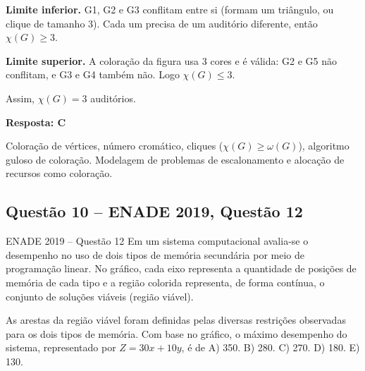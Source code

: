 \documentclass[11pt,a4paper]{article}
\newcommand{\resposta}[1]{\begin{gabarito}\textbf{Resposta: #1}\end{gabarito}}
\begin{document}
\textbf{Limite inferior.} G1, G2 e G3 conflitam entre si (formam um triângulo, ou clique de tamanho 3).
Cada um precisa de um auditório diferente, então $\chi(G) \ge 3$.

\textbf{Limite superior.} A coloração da figura usa 3 cores e é válida: G2 e G5 não conflitam, e
G3 e G4 também não. Logo $\chi(G) \le 3$.

Assim, $\chi(G) = 3$ auditórios.

\resposta{C}

\begin{dica}
Coloração de vértices, número cromático, cliques ($\chi(G)\ge\omega(G)$), algoritmo guloso de coloração.
Modelagem de problemas de escalonamento e alocação de recursos como coloração.
\end{dica}

\subsection{Questão 10 -- ENADE 2019, Questão 12}
\begin{enunciado}{ENADE 2019 -- Questão 12}
Em um sistema computacional avalia-se o desempenho no uso de dois tipos de memória secundária por meio
de programação linear. No gráfico, cada eixo representa a quantidade de posições de memória de cada tipo
e a região colorida representa, de forma contínua, o conjunto de soluções viáveis (região viável).
\begin{center}
\end{center}
As arestas da região viável foram definidas pelas diversas restrições observadas para os dois tipos de
memória. Com base no gráfico, o máximo desempenho do sistema, representado por $Z = 30x + 10y$, é de\quad
A) 350. \quad B) 280. \quad C) 270. \quad D) 180. \quad E) 130.
\end{enunciado}
\end{document}
